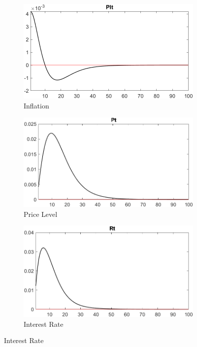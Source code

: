 \documentclass[
	12pt, 
	]{article}
\numberwithin{equation}{section}
\theoremstyle{definition}
\theoremstyle{plain}
\theoremstyle{plain}
\theoremstyle{plain}
\begin{document}
\begin{figure}[h!]
	\vspace*{0.5cm}
	
	\begin{subfigure}[b]{0.3\textwidth}
		\centering
		\includegraphics[width=\textwidth]{shock_ZMt/shock_ZMt_PIt}
		\caption{Inflation}
		\label{fig:ZMt-inflation}
	\end{subfigure}
	\hfill
	\begin{subfigure}[b]{0.3\textwidth}
		\centering
		\includegraphics[width=\textwidth]{shock_ZMt/shock_ZMt_Pt}
		\caption{Price Level}
		\label{fig:ZMt-price}
	\end{subfigure}
	\hfill
	\begin{subfigure}[b]{0.3\textwidth}
		\centering
		\includegraphics[width=\textwidth]{shock_ZMt/shock_ZMt_Rt}
		\caption{Interest Rate}
		\label{fig:ZMt-interest-rate}
	\end{subfigure}
	\hfill
	

\end{figure}
\end{document}
